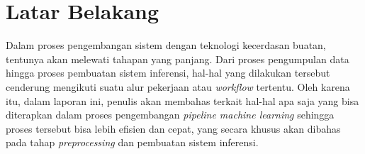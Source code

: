 \section{Latar Belakang}

Dalam proses pengembangan sistem dengan teknologi kecerdasan buatan, tentunya akan melewati tahapan yang panjang.
Dari proses pengumpulan data hingga proses pembuatan sistem inferensi, hal-hal yang dilakukan tersebut cenderung mengikuti suatu alur pekerjaan atau \textit{workflow} tertentu.
Oleh karena itu, dalam laporan ini, penulis akan membahas terkait hal-hal apa saja yang bisa diterapkan dalam proses pengembangan \textit{pipeline machine learning} sehingga proses tersebut bisa lebih efisien dan cepat, yang secara khusus akan dibahas pada tahap \textit{preprocessing} dan pembuatan sistem inferensi.